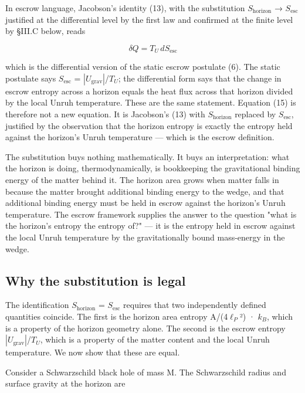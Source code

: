 \documentclass[11pt]{article}
\begin{document}
In escrow language, Jacobson's identity (13), with the substitution
$S_{\mathrm{horizon}}$ → $S_{\mathrm{esc}}$ justified at the differential level by the first law
and confirmed at the finite level by §III.C below, reads

\begin{equation}
  \delta Q = T_{U}\, dS_{\mathrm{esc}}
  \label{eq:15}
\end{equation}

which is the differential version of the static escrow postulate (6).
The static postulate says $S_{\mathrm{esc}}$ = $|U_{\mathrm{grav}}|$/$T_{U}$; the differential form
says that the change in escrow entropy across a horizon equals the heat
flux across that horizon divided by the local Unruh temperature. These
are the same statement. Equation (15) is therefore not a new equation.
It is Jacobson's (13) with $S_{\mathrm{horizon}}$ replaced by $S_{\mathrm{esc}}$, justified by
the observation that the horizon entropy is exactly the entropy held
against the horizon's Unruh temperature --- which is the escrow
definition.

The substitution buys nothing mathematically. It buys an interpretation:
what the horizon is doing, thermodynamically, is bookkeeping the
gravitational binding energy of the matter behind it. The horizon area
grows when matter falls in because the matter brought additional binding
energy to the wedge, and that additional binding energy must be held in
escrow against the horizon's Unruh temperature. The escrow framework
supplies the answer to the question "what is the horizon's entropy the
entropy of?" --- it is the entropy held in escrow against the local
Unruh temperature by the gravitationally bound mass-energy in the wedge.


\subsection{Why the substitution is legal}

The identification $S_{\mathrm{horizon}}$ = $S_{\mathrm{esc}}$ requires that two independently
defined quantities coincide. The first is the horizon area entropy
A/(4$\ell_{P}$²) · $k_{B}$, which is a property of the horizon geometry alone. The
second is the escrow entropy $|U_{\mathrm{grav}}|$/$T_{U}$, which is a property of the
matter content and the local Unruh temperature. We now show that these
are equal.

Consider a Schwarzschild black hole of mass M. The Schwarzschild radius
and surface gravity at the horizon are
\end{document}
